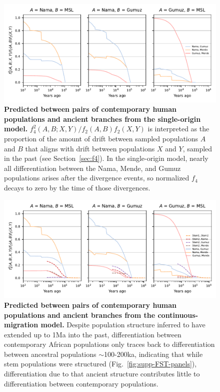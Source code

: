 \documentclass[]{article}
\begin{document}
\begin{figure}[ht]
    \centering
    \includegraphics{figures/supp-f4s-single-origin.pdf}
    \caption{
        \textbf{Predicted  between pairs of contemporary human populations
        and ancient branches from the single-origin model.}
        $f_4^2(A, B; X, Y)/f_2(A, B)f_2(X, Y)$ is interpreted as the proportion of the
        amount of drift between sampled populations $A$ and $B$ that aligns with
        drift between populations $X$ and $Y$, sampled in the past
        (see Section~\ref{sec:f4}). In the single-origin model, nearly all
        differentiation between the Nama, Mende, and Gumuz populations arises
        after the divergence events, so normalized $f_4$ decays to zero by the
        time of those divergences.
    }
    \label{fig:supp-f4s-single-origin}
\end{figure}

\begin{figure}[ht]
    \centering
    \includegraphics{figures/supp-f4s-continuous-migration.pdf}
    \caption{
        \textbf{Predicted  between pairs of contemporary human populations
        and ancient branches from the continuous-migration model.}
        Despite population structure inferred to have extended up to 1Ma
        into the past, differentiation between contemporary African populations
        only traces back to differentiation between ancestral populations
        $\sim$100-200ka, indicating that while stem populations were structured
        (Fig.~\ref{fig:supp-FST-panels}), differentiation due to that
        ancient structure contributes little to differentiation between contemporary
        populations.
    }
    \label{fig:supp-f4s-continuous-migration}
\end{figure}
\end{document}
